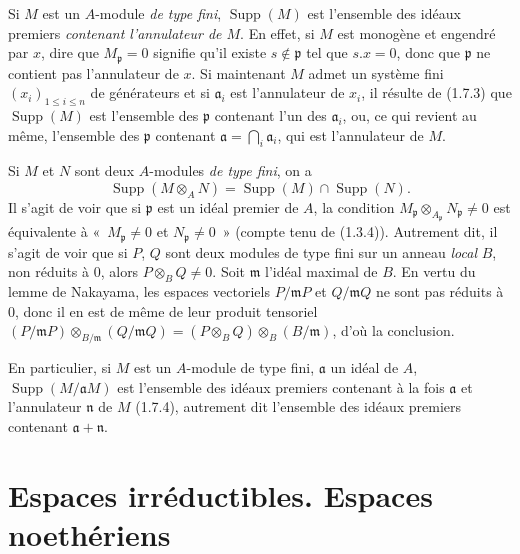 \begin{env}[1.7.4]
\label{0.1.7.4-fr}
Si $M$ est un $A$-module \emph{de type fini}, $\operatorname{Supp}(M)$ est
l'ensemble des idéaux premiers \emph{contenant l'annulateur de $M$}. En effet,
si $M$ est monogène et engendré par $x$, dire que $M_{\mathfrak p}=0$ signifie
qu'il existe $s\notin\mathfrak p$ tel que $s.x=0$, donc que $\mathfrak p$ ne
contient pas l'annulateur de $x$. Si maintenant $M$ admet un système fini
$(x_i)_{1\leq i\leq n}$ de générateurs et si $\mathfrak a_i$ est l'annulateur
de $x_i$, il résulte de (1.7.3) que $\operatorname{Supp}(M)$ est l'ensemble des
$\mathfrak p$ contenant l'un des $\mathfrak a_i$, ou, ce qui revient au même,
l'ensemble des $\mathfrak p$ contenant $\mathfrak a=\bigcap_i\mathfrak a_i$,
qui est l'annulateur de $M$.
\end{env}

\begin{env}[1.7.5]
\label{0.1.7.5-fr}
Si $M$ et $N$ sont deux $A$-modules \emph{de type fini}, on a
\[
  \operatorname{Supp}(M\otimes_A N)
  =\operatorname{Supp}(M)\cap\operatorname{Supp}(N).
\]
Il s'agit de voir que si $\mathfrak p$ est un idéal premier de $A$, la
condition $M_{\mathfrak p}\otimes_{A_{\mathfrak p}}N_{\mathfrak p}\neq0$ est
équivalente à «~$M_{\mathfrak p}\neq0$ et $N_{\mathfrak p}\neq0$~» (compte
tenu de (1.3.4)). Autrement dit, il s'agit de voir que si $P$, $Q$ sont deux
modules de type fini sur un anneau \emph{local} $B$, non réduits à $0$, alors
$P\otimes_B Q\neq0$. Soit $\mathfrak m$ l'idéal maximal de $B$. En vertu du
lemme de Nakayama, les espaces vectoriels $P/\mathfrak mP$ et
$Q/\mathfrak mQ$ ne sont pas réduits à $0$, donc il en est de même de leur
produit tensoriel
$(P/\mathfrak mP)\otimes_{B/\mathfrak m}(Q/\mathfrak mQ)=(P\otimes_B Q)\otimes_B(B/\mathfrak m)$,
d'où la conclusion.

En particulier, si $M$ est un $A$-module de type fini, $\mathfrak a$ un idéal
de $A$, $\operatorname{Supp}(M/\mathfrak aM)$ est l'ensemble des idéaux
premiers contenant à la fois $\mathfrak a$ et l'annulateur $\mathfrak n$ de
$M$ (1.7.4), autrement dit l'ensemble des idéaux premiers contenant
$\mathfrak a+\mathfrak n$.
\end{env}


\section{Espaces irréductibles. Espaces noethériens}
\label{section:0.2-fr}

